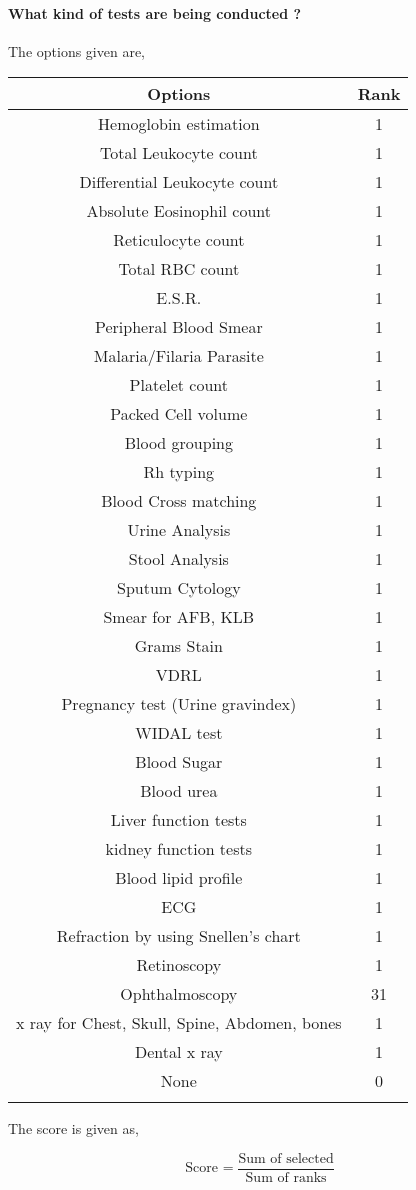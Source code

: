 \documentclass[oneside]{article}
\newcommand{\tsub}[2]{\text{#1}_{\text{#2}}}
\newcommand{\dsub}[2]{\dfrac{\text{#1}}{\text{#2}}}
\newcommand{\multsel}[1]
{
	\[
		\tsub{Score}{#1} = \dsub{Sum of selected}{Sum of ranks}
	\]
}
\newenvironment{ttable}
{
\begin{center}
\begin{tabular}{c|c}
\hline
}
{
\\ \hline
\end{tabular}
\end{center}
}
\begin{document}
\paragraph{ What kind of tests are being conducted ?}

The options given are,
\begin{ttable}
Options & Rank \\ \hline
Hemoglobin estimation & 1 \\
Total Leukocyte count & 1 \\
Differential Leukocyte count & 1 \\
Absolute Eosinophil count & 1 \\
Reticulocyte count & 1 \\
Total RBC count & 1 \\
E.S.R. & 1 \\
Peripheral Blood Smear & 1 \\
Malaria/Filaria Parasite & 1 \\
Platelet count & 1 \\
Packed Cell volume & 1 \\
Blood grouping & 1 \\
Rh typing & 1 \\
Blood Cross matching & 1 \\
Urine Analysis & 1 \\
Stool Analysis & 1 \\
Sputum Cytology & 1 \\
Smear for AFB, KLB & 1 \\
Grams Stain & 1 \\
VDRL & 1 \\
Pregnancy test (Urine gravindex) & 1 \\
WIDAL test & 1 \\
Blood Sugar & 1 \\
Blood urea & 1 \\
Liver function tests & 1 \\
kidney function tests & 1 \\
Blood lipid profile & 1 \\
ECG & 1 \\
Refraction by using Snellen's chart & 1 \\
Retinoscopy & 1 \\
Ophthalmoscopy & 31 \\
x ray for Chest, Skull, Spine, Abdomen, bones & 1 \\
Dental x ray & 1 \\
None & 0 \\
\hline
\end{ttable}
The score is given as,
\multsel{}
\end{document}
